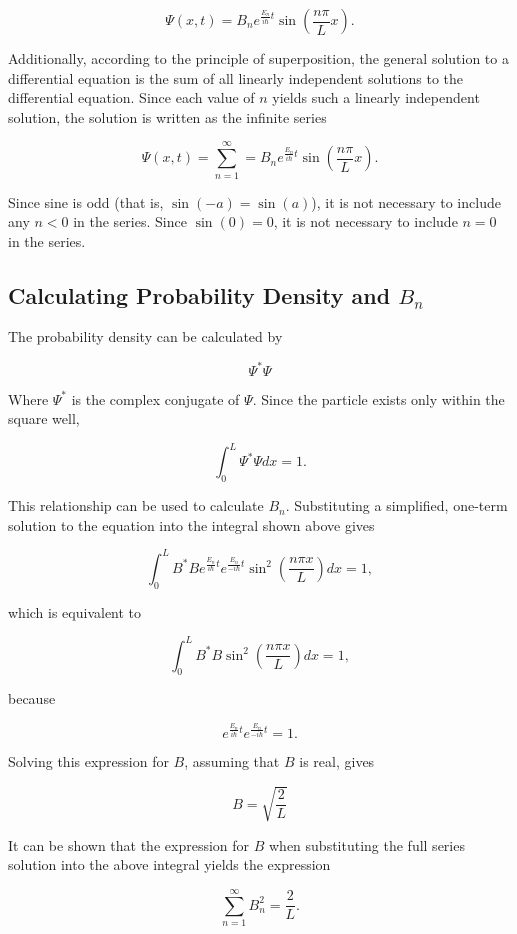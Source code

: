 \documentclass[11pt]{article}
\begin{document}
$$
\Psi(x,t) = B_n e^{\frac{E_n}{i\hbar}t} \sin\left(\frac{n \pi}{L}x\right).
$$

\noindent Additionally, according to the principle of superposition, the general solution to a differential equation is the sum of all linearly independent solutions to the differential equation. Since each value of $n$ yields such a linearly independent solution, the solution is written as the infinite series

$$
\Psi(x,t) = \sum_{n=1}^{\infty} = B_n e^{\frac{E_n}{i\hbar}t} \sin\left(\frac{n \pi}{L}x\right).
$$

\noindent Since sine is odd (that is, $\sin(-a) = \sin(a)$), it is not necessary to include any $n<0$ in the series. Since $\sin(0) = 0$, it is not necessary to include $n=0$ in the series.

\subsection{Calculating Probability Density and $B_n$}

The probability density can be calculated by

$$
\Psi^{*} \Psi
$$

\noindent Where $\Psi^{*}$ is the complex conjugate of $\Psi$. Since the particle exists only within the square well,

$$
\int_{0}^{L} \Psi^{*}\Psi dx = 1.
$$

\noindent This relationship can be used to calculate $B_n$. Substituting a simplified, one-term solution to the equation into the integral shown above gives

$$
\int_{0}^{L} B^{*}B e^{\frac{E_n}{i \hbar}t} e^{\frac{E_n}{-i \hbar}t} \sin^2\left(\frac{n \pi x}{L}\right)dx = 1,
$$

\noindent which is equivalent to

$$
\int_{0}^{L} B^{*}B \sin^2\left(\frac{n \pi x}{L}\right)dx = 1,
$$

\noindent because

$$
e^{\frac{E_n}{i \hbar}t} e^{\frac{E_n}{-i \hbar}t} = 1.
$$

\noindent Solving this expression for $B$, assuming that $B$ is real, gives

$$
B = \sqrt{\frac{2}{L}}
$$

It can be shown that the expression for $B$ when substituting the full series solution into the above integral yields the expression

$$
\sum_{n=1}^{\infty} B_n^2 = \frac{2}{L}.
$$
\end{document}
